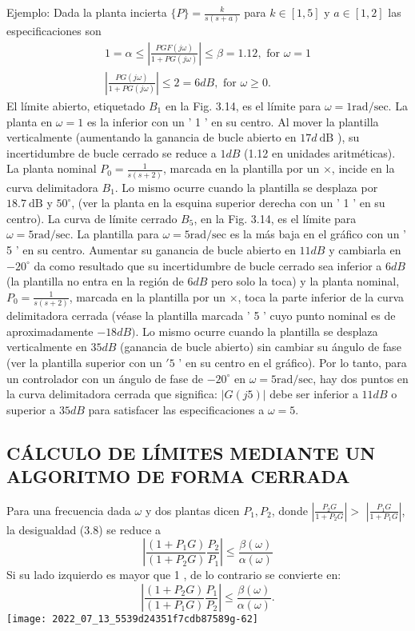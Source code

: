 Ejemplo: Dada la planta incierta $\{P\}=\frac{k}{s(s+a)}$ para $k \in[1,5]$ y $a \in[1,2]$ las especificaciones son
$$
\begin{array}{ll}
1=\alpha \leq\left|\frac{P G F(j \omega)}{1+P G(j \omega)}\right| \leq \beta=1.12, \text { for } \omega=1 \\
\left|\frac{P G(j \omega)}{1+P G(j \omega)}\right| \leq 2=6 d B, \text { for } \omega \geq 0 .
\end{array}
$$
El límite abierto, etiquetado $B_{1}$ en la Fig. 3.14, es el límite para $\omega=1 \mathrm{rad} / \mathrm{sec}$. La planta en $\omega=1$ es la inferior con un ' 1 ' en su centro. Al mover la plantilla verticalmente (aumentando la ganancia de bucle abierto en $17 d \mathrm{~dB}$ ), su incertidumbre de bucle cerrado se reduce a $1 d B$ (1.12 en unidades aritméticas). La planta nominal $P_{0}=\frac{1}{s(s+2)}$, marcada en la plantilla por un $\times$, incide en la curva delimitadora $B_{1}$. Lo mismo ocurre cuando la plantilla se desplaza por $18.7 \mathrm{~dB}$ y $50^{\circ}$, (ver la planta en la esquina superior derecha con un ' 1 ' en su centro). La curva de límite cerrado $B_{5}$, en la Fig. 3.14, es el límite para $\omega=5 \mathrm{rad} / \mathrm{sec}$. La plantilla para $\omega=5 \mathrm{rad} / \mathrm{sec}$ es la más baja en el gráfico con un ' 5 ' en su centro. Aumentar su ganancia de bucle abierto en $11 d B$ y cambiarla en $-20^{\circ}$ da como resultado que su incertidumbre de bucle cerrado sea inferior a $6 d B$ (la plantilla no entra en la región de $6 d B$ pero solo la toca) y la planta nominal, $P_{0}=\frac{1}{s(s+2)}$, marcada en la plantilla por un $\times$,  toca la parte inferior de la curva delimitadora cerrada (véase la plantilla marcada ' 5 ' cuyo punto nominal es de aproximadamente $-18 d B)$. Lo mismo ocurre cuando la plantilla se desplaza verticalmente en $35 d B$ (ganancia de bucle abierto) sin cambiar su ángulo de fase (ver la plantilla superior con un $' 5$ ' en su centro en el gráfico). Por lo tanto, para un controlador con un ángulo de fase de $-20^{\circ}$ en $\omega=5 \mathrm{rad} / \mathrm{sec}$, hay dos puntos en la curva delimitadora cerrada que significa: $| G(j 5)|$ debe ser inferior a $11 d B$ o superior a $35 d B$ para satisfacer las especificaciones a $\omega=5$.

\subsection{CÁLCULO DE LÍMITES MEDIANTE UN ALGORITMO DE FORMA CERRADA}
Para una frecuencia dada $\omega$ y dos plantas dicen $P_{1}, P_{2}$, donde $\left|\frac{P_{2} G}{1+P_{2} G}\right|>$ $\left|\frac{P_{1} G}{1+P_{1} G}\right|$, la desigualdad (3.8) se reduce a
$$
\left|\frac{\left(1+P_{1} G\right)}{\left(1+P_{2} G\right)} \frac{P_{2}}{P_{1}}\right| \leq \frac{\beta(\omega)}{\alpha(\omega)}
$$
Si su lado izquierdo es mayor que 1 , de lo contrario se convierte en:
$$
\left|\frac{\left(1+P_{2} G\right)}{\left(1+P_{1} G\right)} \frac{P_{1}}{P_{2}}\right| \leq \frac{\beta(\omega)}{\alpha(\omega)} .
$$
\texttt{[image: 2022\_07\_13\_5539d24351f7cdb87589g-62]}

